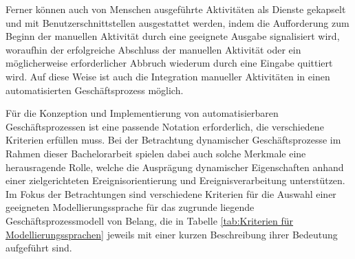 Ferner können auch von Menschen ausgeführte Aktivitäten als Dienste gekapselt und mit Benutzerschnittstellen ausgestattet werden, indem die Aufforderung zum Beginn der manuellen Aktivität durch eine geeignete Ausgabe signalisiert wird, woraufhin der erfolgreiche Abschluss der manuellen Aktivität oder ein möglicherweise erforderlicher Abbruch wiederum durch eine Eingabe quittiert wird. 
Auf diese Weise ist auch die Integration manueller Aktivitäten in einen automatisierten Geschäftsprozess möglich.

Für die Konzeption und Implementierung von automatisierbaren Geschäftsprozessen ist eine passende Notation erforderlich, die verschiedene Kriterien erfüllen muss.
Bei der Betrachtung dynamischer Geschäftsprozesse im Rahmen dieser Bachelorarbeit spielen dabei auch solche Merkmale eine herausragende Rolle, welche die Ausprägung dynamischer Eigenschaften anhand einer zielgerichteten Ereignisorientierung und Ereignisverarbeitung unterstützen.
Im Fokus der Betrachtungen sind verschiedene Kriterien für die Auswahl einer geeigneten Modellierungssprache für das zugrunde liegende Geschäftsprozessmodell von Belang, die in Tabelle \ref{tab:Kriterien für Modellierungssprachen} jeweils mit einer kurzen Beschreibung ihrer Bedeutung aufgeführt sind.

